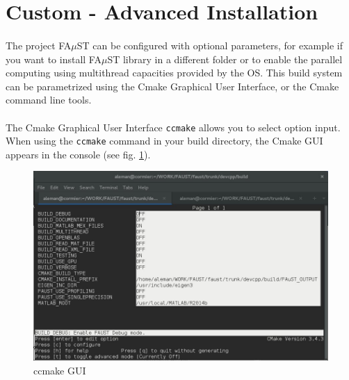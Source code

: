 

\section{Custom - Advanced Installation}\label{sec:UnixCustomInstall}

\paragraph{}The project FA$\mu$ST can be configured with optional parameters, for example if you want to install FA$\mu$ST library in a different folder or to enable the parallel computing using multithread capacities provided by the OS. This build system can be parametrized using the Cmake Graphical User Interface, or the Cmake command line tools. 

\paragraph{}The Cmake Graphical User Interface \texttt{ccmake} allows you to select option input. When using the \texttt{ccmake} command in your build directory, the Cmake GUI appears in the console (see fig. \ref{fig:ccmake}).

\begin{figure}[!h] %
\centering
\includegraphics[scale=0.5]{images/ccmake.jpg}
\caption{ccmake GUI}
\label{fig:ccmake}
\end{figure}


